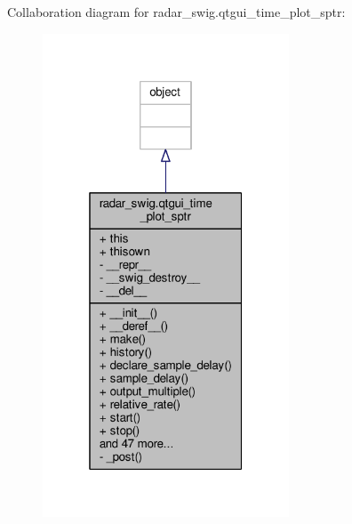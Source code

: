 Collaboration diagram for radar\+\_\+swig.\+qtgui\+\_\+time\+\_\+plot\+\_\+sptr\+:
\nopagebreak
\begin{figure}[H]
\begin{center}
\leavevmode
\includegraphics[width=208pt]{d3/d26/classradar__swig_1_1qtgui__time__plot__sptr__coll__graph}
\end{center}
\end{figure}
